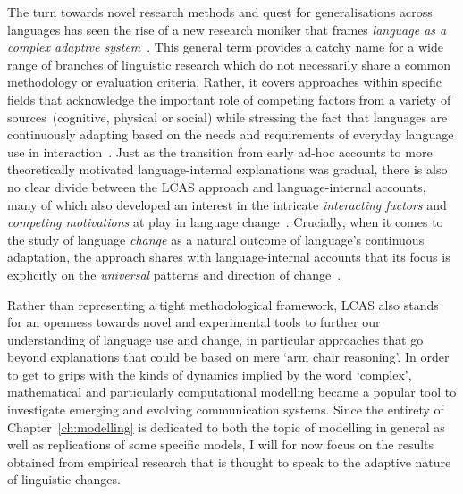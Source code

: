 The turn towards novel research methods and quest for generalisations across languages has seen the rise of a new research moniker that frames \emph{language as a complex adaptive system}~\citep[\emph{LCAS} for short, see e.g.][]{Steels1998,Steels2000,Smith2003,Situngkir2004}. This general term provides a catchy name for a wide range of branches of linguistic research which do not necessarily share a common methodology or evaluation criteria. Rather, it covers approaches within specific fields that acknowledge the important role of competing factors from a variety of sources~(cognitive, physical or social) while stressing the fact that languages are continuously adapting based on the needs and requirements of everyday language use in interaction~\citep{LCAS2009}. Just as the transition from early ad-hoc accounts to more theoretically motivated language-internal explanations was gradual, there is also no clear divide between the LCAS approach and language-internal accounts, many of which also developed an interest in the intricate \emph{interacting factors} and \emph{competing motivations} at play in language change~\citep{Vachek1962,Berg1998,Thomsen2006,Wedel2009,MacWhinney2014}.
Crucially, when it comes to the study of language \emph{change} as a natural outcome of language's continuous adaptation, the approach shares with language-internal accounts that its focus is explicitly on the \emph{universal} patterns and direction of change~\citep[p.4-5]{LCAS2009}.

Rather than representing a tight methodological framework, LCAS also stands for an openness towards novel and experimental tools to further our understanding of language use and change, in particular approaches that go beyond explanations that could be based on mere `arm chair reasoning'. In order to get to grips with the kinds of dynamics implied by the word `complex', mathematical and particularly computational modelling became a popular tool to investigate emerging and evolving communication systems. Since the entirety of Chapter~\ref{ch:modelling} is dedicated to both the topic of modelling in general as well as replications of some specific models, I will for now focus on the results obtained from empirical research that is thought to speak to the adaptive nature of linguistic changes.

